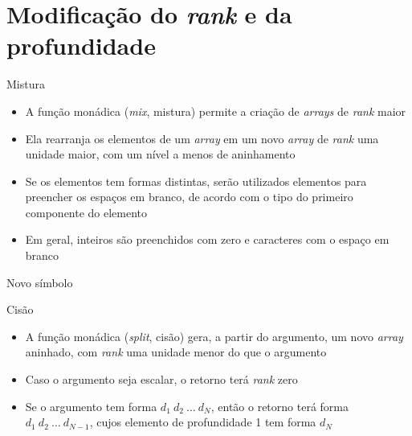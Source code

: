 \section{Modificação do {\it rank} e da profundidade}

\begin{frame}[fragile]{Mistura}

    \begin{itemize}
        \item A função monádica  (\textit{mix}, mistura) permite a criação de 
            \textit{arrays} de \textit{rank} maior

        \item Ela rearranja os elementos de um \textit{array} em um novo \textit{array} de 
            \textit{rank} uma unidade maior, com um nível a menos de aninhamento

        \item Se os elementos tem formas distintas, serão utilizados elementos para preencher os
            espaços em branco, de acordo com o tipo do primeiro componente do elemento

        \item Em geral, inteiros são preenchidos com zero e caracteres com o espaço em branco
    \end{itemize}

\end{frame}

\begin{frame}[fragile]{Novo símbolo}


\end{frame}

\begin{frame}[fragile]{Cisão}

    \begin{itemize}
        \item A função monádica  (\textit{split}, cisão) gera, a partir do argumento,
            um novo \textit{array} aninhado, com \textit{rank} uma unidade menor do que o argumento 

        \item Caso o argumento seja escalar, o retorno terá \textit{rank} zero

        \item Se o argumento tem forma $d_1\ d_2\ \ldots\ d_N$, então o retorno terá forma
            $d_1\ d_2\ \ldots\ d_{N-1}$, cujos elemento de profundidade 1 tem forma $d_N$
    \end{itemize}

\end{frame}

